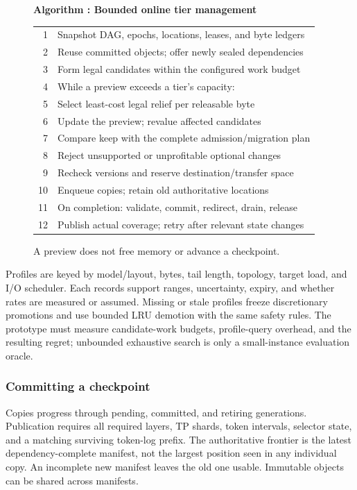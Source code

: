 \begin{figure}[t]
 \raggedright
 \label{alg:placement}
 \textbf{Algorithm \thedesignalgorithm: Bounded online tier management}
 \par\smallskip
 \begin{tabularx}{\columnwidth}{@{}r@{\quad}X@{}}
 \toprule
 1 & Snapshot DAG, epochs, locations, leases, and byte ledgers \\
 2 & Reuse committed objects; offer newly sealed dependencies \\
 3 & Form legal candidates within the configured work budget \\
 4 & While a preview exceeds a tier's capacity: \\
 5 & \quad Select least-cost legal relief per releasable byte \\
 6 & \quad Update the preview; revalue affected candidates \\
 7 & Compare keep with the complete admission/migration plan \\
 8 & Reject unsupported or unprofitable optional changes \\
 9 & Recheck versions and reserve destination/transfer space \\
 10 & Enqueue copies; retain old authoritative locations \\
 11 & On completion: validate, commit, redirect, drain, release \\
 12 & Publish actual coverage; retry after relevant state changes \\
 \bottomrule
 \end{tabularx}
 \caption*{A preview does not free memory or advance a checkpoint.}
\end{figure}

Profiles are keyed by model/layout, bytes, tail length, topology, target
load, and I/O scheduler. Each records support ranges, uncertainty, expiry,
and whether rates are measured or assumed. Missing or stale profiles
freeze discretionary promotions and use bounded LRU demotion with the
same safety rules. The prototype must measure candidate-work budgets,
profile-query overhead, and the resulting regret; unbounded exhaustive
search is only a small-instance evaluation oracle.

\subsubsection{Committing a checkpoint}
\label{sec:checkpoint}
Copies progress through pending, committed, and retiring generations.
Publication requires all required layers, TP shards, token intervals,
selector state, and a matching surviving token-log prefix. The authoritative
frontier is the latest dependency-complete manifest, not the largest
position seen in any individual copy. An incomplete new manifest leaves
the old one usable. Immutable objects can be shared across manifests.

